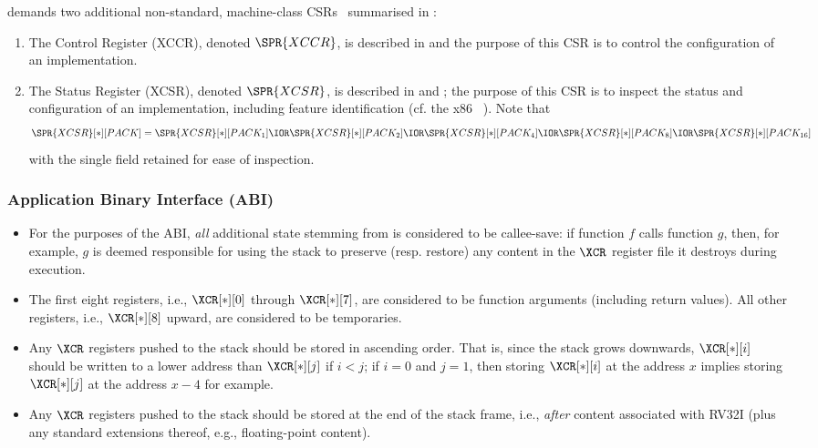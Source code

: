 \XCID 
demands two additional
non-standard, machine-class CSRs~\cite[Section 2]{SCARV:RV:ISA:II:17}
summarised in :

\begin{enumerate}
\item The \XCID Control Register (XCCR), denoted $\SPR{XCCR}$,
      is described in  and 
      the purpose of this CSR is to 
      control the            configuration of an \XCID implementation.
\item The \XCID Status  Register (XCSR), denoted $\SPR{XCSR}$,
      is described in  and ;
      the purpose of this CSR is to 
      inspect the status and configuration of an \XCID implementation,
      including feature identification
      (cf. the x86 ~\cite[Page 3-190--3-224]{SCARV:X86:2:18}).
      Note that 
      \[
      \SPR{XCSR}[*][PACK] = \SPR{XCSR}[*][PACK_{ 1}] \IOR
                            \SPR{XCSR}[*][PACK_{ 2}] \IOR
                            \SPR{XCSR}[*][PACK_{ 4}] \IOR
                            \SPR{XCSR}[*][PACK_{ 8}] \IOR
                            \SPR{XCSR}[*][PACK_{16}]
      \]
      with the single field retained for ease of inspection.
\end{enumerate}


\subsubsection{Application Binary Interface (ABI)}
\label{sec:spec:state:abi}

\begin{itemize}
\item For the purposes of the ABI, {\em all} additional state stemming from 
      \XCID is considered to be callee-save: if function $f$ calls function
      $g$, then, for example, $g$ is deemed responsible for using the stack
      to preserve (resp. restore) any content in the $\XCR$ register file 
      it destroys during execution.
\item The first eight registers, 
      i.e., $\XCR[*][0]$ through $\XCR[*][7]$, 
      are considered to be function arguments (including return values).
      All other registers, 
      i.e., $\XCR[*][8]$ upward,
      are considered to be temporaries.
\item Any $\XCR$ registers pushed to the stack should be stored 
      in ascending order.
      That is, since the stack grows downwards, 
      $\XCR[*][i]$
      should be written to a lower address than
      $\XCR[*][j]$
      if $i < j$; if $i = 0$ and $j = 1$, then storing $\XCR[*][i]$ at the
      address $x$ implies storing $\XCR[*][j]$ at the address $x - 4$ for
      example.
\item Any $\XCR$ registers pushed to the stack should be stored 
      at the end of the stack frame, 
      i.e., {\em after} content associated with RV32I (plus any standard 
      extensions thereof, e.g., floating-point content).
\end{itemize}

